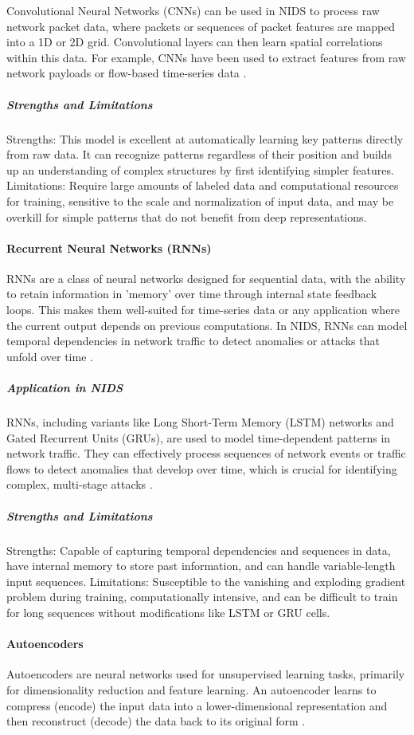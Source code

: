 Convolutional Neural Networks (CNNs) can be used in NIDS to process raw network packet data, where packets or sequences of packet features are mapped into a 1D or 2D grid. Convolutional layers can then learn spatial correlations within this data. For example, CNNs have been used to extract features from raw network payloads or flow-based time-series data \parencite {liu2023intrusion}.

\subparagraph{Strengths and Limitations} 
Strengths: This model is excellent at automatically learning key patterns directly from raw data. It can recognize patterns regardless of their position and builds up an understanding of complex structures by first identifying simpler features.
Limitations: Require large amounts of labeled data and computational resources for training, sensitive to the scale and normalization of input data, and may be overkill for simple patterns that do not benefit from deep representations.

\paragraph{Recurrent Neural Networks (RNNs)} 
RNNs are a class of neural networks designed for sequential data, with the ability to retain information in 'memory' over time through internal state feedback loops. This makes them well-suited for time-series data or any application where the current output depends on previous computations. In NIDS, RNNs can model temporal dependencies in network traffic to detect anomalies or attacks that unfold over time \parencite {zou2021survey}.

\subparagraph{Application in NIDS} 
RNNs, including variants like Long Short-Term Memory (LSTM) networks and Gated Recurrent Units (GRUs), are used to model time-dependent patterns in network traffic. They can effectively process sequences of network events or traffic flows to detect anomalies that develop over time, which is crucial for identifying complex, multi-stage attacks \parencite {al2020survey}.

\subparagraph{Strengths and Limitations} 
Strengths: Capable of capturing temporal dependencies and sequences in data, have internal memory to store past information, and can handle variable-length input sequences.
Limitations: Susceptible to the vanishing and exploding gradient problem during training, computationally intensive, and can be difficult to train for long sequences without modifications like LSTM or GRU cells.

\paragraph{Autoencoders} 
Autoencoders are neural networks used for unsupervised learning tasks, primarily for dimensionality reduction and feature learning. An autoencoder learns to compress (encode) the input data into a lower-dimensional representation and then reconstruct (decode) the data back to its original form \parencite {zou2021survey}.

